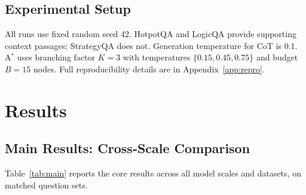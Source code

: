 \documentclass{article}
\newcommand{\astar}{A$^*$\xspace}
\begin{document}
\subsection{Experimental Setup}
\label{sec:setup}

All runs use fixed random seed 42. HotpotQA and LogicQA provide supporting context passages; StrategyQA does not. Generation temperature for CoT is 0.1. \astar uses branching factor $K=3$ with temperatures $\{0.15, 0.45, 0.75\}$ and budget $B=15$ nodes. Full reproducibility details are in Appendix~\ref{app:repro}.

\section{Results}
\label{sec:results}

\subsection{Main Results: Cross-Scale Comparison}
\label{sec:main_results}

Table~\ref{tab:main} reports the core results across all model scales and datasets, on matched question sets.
\end{document}
